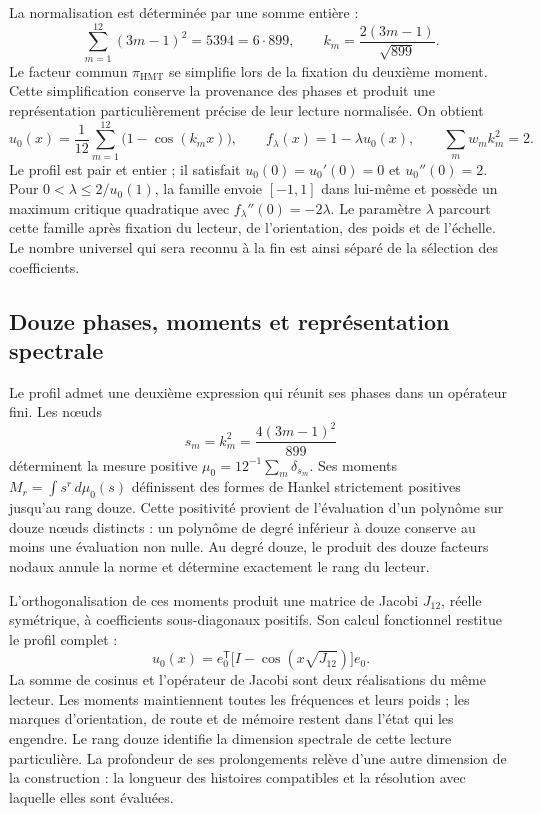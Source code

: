 La normalisation est déterminée par une somme entière :
\[
\sum_{m=1}^{12}(3m-1)^2=5394=6\cdot899,
\qquad k_m=\frac{2(3m-1)}{\sqrt{899}}.
\]
Le facteur commun \(\pi_{\mathrm{HMT}}\) se simplifie lors de la fixation du deuxième moment.
Cette simplification conserve la provenance des phases et produit une
représentation particulièrement précise de leur lecture normalisée. On obtient
\[
u_0(x)=\frac1{12}\sum_{m=1}^{12}\bigl(1-\cos(k_mx)\bigr),
\qquad f_\lambda(x)=1-\lambda u_0(x),
\qquad \sum_mw_mk_m^2=2.
\]
Le profil est pair et entier ; il satisfait \(u_0(0)=u_0'(0)=0\) et
\(u_0''(0)=2\). Pour \(0<\lambda\le2/u_0(1)\), la famille envoie
\([-1,1]\) dans lui-même et possède un maximum critique quadratique avec
\(f_\lambda''(0)=-2\lambda\). Le paramètre \(\lambda\) parcourt cette famille
après fixation du lecteur, de l’orientation, des poids et de l’échelle. Le nombre
universel qui sera reconnu à la fin est ainsi séparé de la sélection
des coefficients.

\subsection{Douze phases, moments et représentation spectrale}

Le profil admet une deuxième expression qui réunit ses phases dans un opérateur
fini. Les nœuds
\[
s_m=k_m^2=\frac{4(3m-1)^2}{899}
\]
déterminent la mesure positive \(\mu_0=12^{-1}\sum_m\delta_{s_m}\). Ses
moments \(M_r=\int s^r\,d\mu_0(s)\) définissent des formes de Hankel strictement
positives jusqu’au rang douze. Cette positivité provient de l’évaluation
d’un polynôme sur douze nœuds distincts : un polynôme de degré inférieur à
douze conserve au moins une évaluation non nulle. Au degré douze, le produit
des douze facteurs nodaux annule la norme et détermine exactement le rang
du lecteur.

L’orthogonalisation de ces moments produit une matrice de Jacobi
\(J_{12}\), réelle symétrique, à coefficients sous-diagonaux positifs. Son calcul fonctionnel
restitue le profil complet :
\[
u_0(x)=e_0^{\mathsf T}
\bigl[I-\cos(x\sqrt{J_{12}})\bigr]e_0.
\]
La somme de cosinus et l’opérateur de Jacobi sont deux réalisations du même
lecteur. Les moments maintiennent toutes les fréquences et leurs poids ; les
marques d’orientation, de route et de mémoire restent dans l’état qui les
engendre. Le rang douze identifie la dimension spectrale de cette lecture
particulière. La profondeur de ses prolongements relève d’une autre dimension
de la construction : la longueur des histoires compatibles et la résolution
avec laquelle elles sont évaluées.

